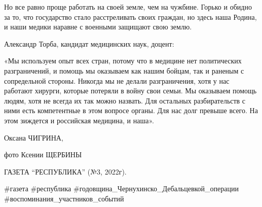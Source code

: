 Но все равно проще работать на своей земле, чем на чужбине. Горько и обидно за
то, что государство стало расстреливать своих граждан, но здесь наша Родина, и
наши медики наравне с военными защищают свою землю. 

Александр Торба, кандидат медицинских наук, доцент:

«Мы используем опыт всех стран, потому что в медицине нет политических
разграничений, и помощь мы оказываем как нашим бойцам, так и раненым с
сопредельной стороны. Никогда мы не делали разграничения, хотя у нас работают
хирурги, которые потеряли в войну свои семьи. Мы оказываем помощь людям, хотя
не всегда их так можно назвать. Для остальных разбирательств с ними есть
компетентные в этом вопросе органы. Для нас долг превыше всего. На этом
зиждется и российская медицина, и наша».

Оксана ЧИГРИНА, 

фото Ксении ЩЕРБИНЫ

ГАЗЕТА \enquote{РЕСПУБЛИКА} (№3, 2022г).

\#газета \#республика \#годовщина\_Чернухинско\_Дебальцевкой\_операции
\#воспоминания\_участников\_событий

